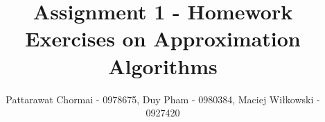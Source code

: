 \documentclass[12pt]{article}
\begin{document}
\title{Assignment 1 - Homework Exercises on Approximation Algorithms}
\author{Pattarawat Chormai - 0978675, Duy Pham - 0980384, Maciej Wiłkowski - 0927420}
\maketitle











\end{document}
